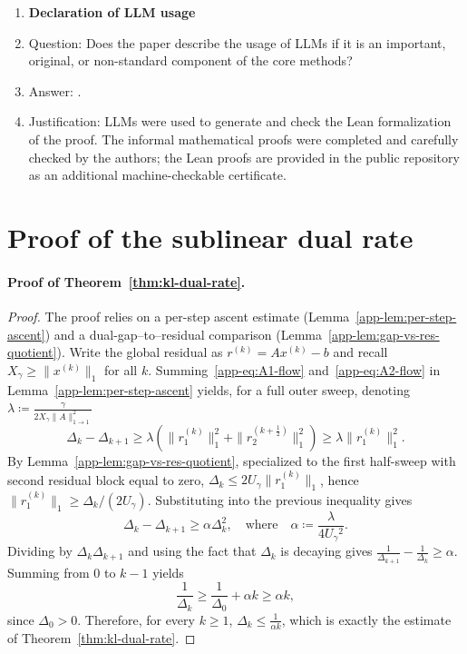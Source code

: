 \documentclass{article}
\theoremstyle{plain}
\newcommand{\eqdef}{\coloneqq}
\newcommand{\Umax}{U_\gamma}
\newcommand{\Xmax}{X_\gamma}
\begin{document}
\begin{enumerate}
\item {\bf Declaration of LLM usage}
\item[] Question: Does the paper describe the usage of LLMs if it is an important, original, or non-standard component of the core methods?
\item[] Answer: \answerYes{}.
\item[] Justification: LLMs were used to generate and check the Lean formalization of the proof. The informal mathematical proofs were completed and carefully checked by the authors; the Lean proofs are provided in the public repository as an additional machine-checkable certificate.

\end{enumerate}
\appendix
\section{Proof of the sublinear dual rate}
\label{app-app:dual-rate-proofs}

\paragraph{Proof of Theorem~\ref{thm:kl-dual-rate}.}
\begin{proof}
The proof relies on a per-step ascent estimate (Lemma~\ref{app-lem:per-step-ascent}) and a dual-gap--to--residual comparison (Lemma~\ref{app-lem:gap-vs-res-quotient}).
%
Write the global residual as $r^{(k)}=Ax^{(k)}-b$ and recall $\Xmax{} \ge \|x^{(k)}\|_1$ for all $k$.
% 
%
Summing~\eqref{app-eq:A1-flow} and~\eqref{app-eq:A2-flow} in Lemma~\ref{app-lem:per-step-ascent} yields, for a full outer sweep, denoting $\lambda \eqdef \frac{\gamma}{2 \Xmax{} \|A\|_{1\to1}^2}$
\[
  \Delta_{k}-\Delta_{k+1}
   \ge 
  \lambda ( \|r^{(k)}_{1}\|_{1}^{2}+\|r^{(k+\tfrac12)}_{2}\|_{1}^{2} ) \geq \lambda \|r^{(k)}_{1}\|_{1}^{2}. 
\]
%
By Lemma~\ref{app-lem:gap-vs-res-quotient}, specialized to the first half-sweep with
second residual block equal to zero, $\Delta_k \le 2\Umax{} \|r_1^{(k)}\|_{1}$, hence
$\|r^{(k)}_1\|_{1}\ge \Delta_k/(2\Umax{})$. Substituting into the previous inequality gives
\[
  \Delta_{k}-\Delta_{k+1}
   \ge 
  \alpha \Delta_k^2, \quad\text{where}\quad \alpha \eqdef \frac{\lambda}{4 \Umax{}^2}.
\]
%
Dividing by $\Delta_k \Delta_{k+1}$ and using the fact that $\Delta_k$ is decaying gives
$  \frac{1}{\Delta_{k+1}}-\frac{1}{\Delta_{k}}
   \ge \alpha.
$
Summing from $0$ to $k-1$ yields
\[
  \frac{1}{\Delta_{k}}
   \ge 
  \frac{1}{\Delta_{0}}+\alpha k
   \ge  \alpha k,
\]
since $\Delta_{0}>0$. Therefore, for every $k\ge1$,  $\Delta_{k} \le \frac{1}{\alpha k}$,
which is exactly the estimate of Theorem~\ref{thm:kl-dual-rate}.
\end{proof}
\end{document}
